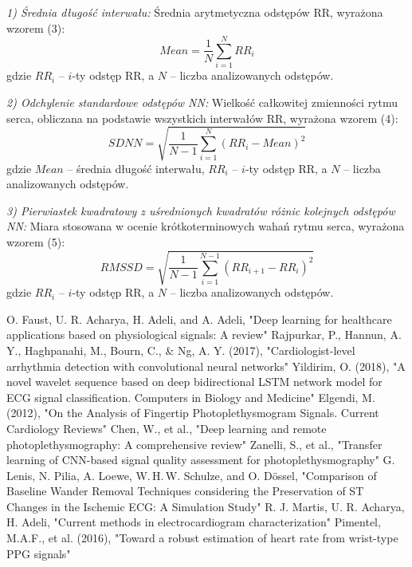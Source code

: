 \documentclass[journal]{IEEEtran}
\begin{document}
\noindent\textit{1) Średnia długość interwału:} 
Średnia arytmetyczna odstępów RR, wyrażona wzorem (3):
\begin{equation}
    Mean = \frac{1}{N} \sum_{i=1}^{N} RR_i
\end{equation}
gdzie $RR_i$ -- $i$-ty odstęp RR, a $N$ – liczba analizowanych odstępów.

\noindent\textit{2) Odchylenie standardowe odstępów NN:} 
Wielkość całkowitej zmienności rytmu serca, obliczana na podstawie wszystkich interwałów RR, wyrażona wzorem (4):
\begin{equation}
    SDNN = \sqrt{\frac{1}{N-1} \sum_{i=1}^{N} (RR_i - Mean)^2}
\end{equation}
gdzie $Mean$ – średnia długość interwału, $RR_i$ – $i$-ty odstęp RR, a $N$ – liczba analizowanych odstępów. \textbf{}

\noindent\textit{3) Pierwiastek kwadratowy z uśrednionych kwadratów różnic kolejnych odstępów NN:} 
Miara stosowana w ocenie krótkoterminowych wahań rytmu serca, wyrażona wzorem (5):
\begin{equation}
    RMSSD = \sqrt{\frac{1}{N-1} \sum_{i=1}^{N-1} (RR_{i+1} - RR_i)^2}
\end{equation}
gdzie $RR_i$ -- $i$-ty odstęp RR, a $N$ – liczba analizowanych odstępów.


 
\newpage
\begin{thebibliography}{1}
 O. Faust, U. R. Acharya, H. Adeli, and A. Adeli, "Deep learning for healthcare applications based on physiological signals: A review"
 Rajpurkar, P., Hannun, A. Y., Haghpanahi, M., Bourn, C., \& Ng, A. Y. (2017), "Cardiologist-level arrhythmia detection with convolutional neural networks"
 Yildirim, O. (2018), "A novel wavelet sequence based on deep bidirectional LSTM network model for ECG signal classification. Computers in Biology and Medicine"
 Elgendi, M. (2012), "On the Analysis of Fingertip Photoplethysmogram Signals. Current Cardiology Reviews"
Chen, W., et al., "Deep learning and remote photoplethysmography: A comprehensive review" 
Zanelli, S., et al., "Transfer learning of CNN-based signal quality assessment for photoplethysmography"
 G. Lenis, N. Pilia, A. Loewe, W. H. W. Schulze, and O. Dössel, "Comparison of Baseline Wander Removal Techniques considering the Preservation of ST Changes in the Ischemic ECG: A Simulation Study"
 R. J. Martis, U. R. Acharya, H. Adeli, "Current methods in electrocardiogram characterization"
 Pimentel, M.A.F., et al. (2016), "Toward a robust estimation of heart rate from wrist-type PPG signals"

\end{thebibliography}
\end{document}
